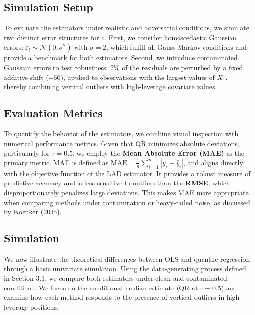 \documentclass[fleqn,10pt]{latex/stylish_article} %
\begin{document}
\subsection{Simulation Setup}\label{simulation-setup}

To evaluate the estimators under realistic and adversarial conditions, we simulate two distinct error structures for \(\varepsilon\). First, we consider homoscedastic Gaussian errors: \(\varepsilon_i \sim \mathcal{N}(0, \sigma^2)\) with \(\sigma = 2\), which fulfill all Gauss-Markov conditions and provide a benchmark for both estimators. Second, we introduce contaminated Gaussian errors to test robustness: 2\% of the residuals are perturbed by a fixed additive shift (\(+50\)), applied to observations with the largest values of \(X_1\), thereby combining vertical outliers with high-leverage covariate values.

\subsection{Evaluation Metrics}\label{evaluation-metrics}

To quantify the behavior of the estimators, we combine visual inspection with numerical performance metrics. Given that QR minimizes absolute deviations, particularly for \(\tau = 0.5\), we employ the \textbf{Mean Absolute Error (MAE)} as the primary metric. MAE is defined as \(\text{MAE} = \frac{1}{n} \sum_{i=1}^n |y_i - \hat{y}_i|\), and aligns directly with the objective function of the LAD estimator. It provides a robust measure of predictive accuracy and is less sensitive to outliers than the \textbf{RMSE}, which disproportionately penalizes large deviations. This makes MAE more appropriate when comparing methods under contamination or heavy-tailed noise, as discussed by Koenker (2005).

\subsection{Simulation}\label{simulation}

We now illustrate the theoretical differences between OLS and quantile regression through a basic univariate simulation. Using the data-generating process defined in Section 3.1, we compare both estimators under clean and contaminated conditions. We focus on the conditional median estimate (QR at \(\tau = 0.5\)) and examine how each method responds to the presence of vertical outliers in high-leverage positions.
\end{document}
